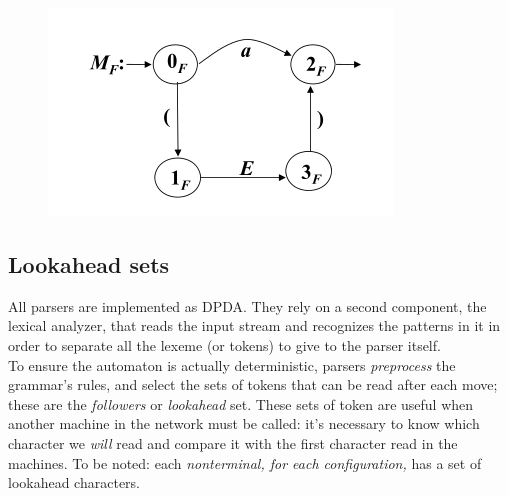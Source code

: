 				\begin{figure}[htp]
					\begin{center}
						\includegraphics[]{./images/exF.png}
					\end{center}
				\end{figure}
				
		\subsection{Lookahead sets}
			All parsers are implemented as DPDA. They rely on a second component, the lexical analyzer, that reads the input stream and recognizes the patterns in it in order to separate all the lexeme (or tokens) to give to the parser itself.\\
			To ensure the automaton is actually deterministic, parsers \emph{preprocess} the grammar's rules, and select the sets of tokens that can be read after each move; these are the \emph{followers} or \emph{lookahead} set. These sets of token are useful when another machine in the network must be called: it's necessary to know which character we \emph{will} read and compare it with the first character read in the machines. To be noted: each \emph{nonterminal, for each configuration,} has a set of lookahead characters. 
			
